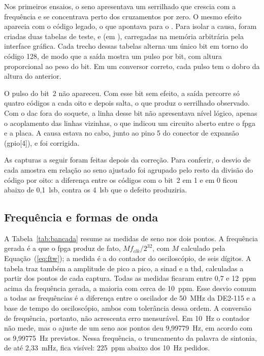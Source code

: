Nos primeiros ensaios, o seno apresentava um serrilhado que crescia com a frequência e se concentrava perto dos cruzamentos por zero. O mesmo efeito aparecia com o código legado, o que apontava para o . Para isolar a causa, foram criadas duas tabelas de teste,  e  (em ), carregadas na memória arbitrária pela interface gráfica. Cada trecho dessas tabelas alterna um único bit em torno do código 128, de modo que a saída mostra um pulso por bit, com altura proporcional ao peso do bit. Em um conversor correto, cada pulso tem o dobro da altura do anterior.

O pulso do bit~2 não apareceu. Com esse bit sem efeito, a saída percorre só quatro códigos a cada oito e depois salta, o que produz o serrilhado observado. Com o \acs{dac} fora do soquete, a linha desse bit não apresentava nível lógico, apenas o acoplamento das linhas vizinhas, o que indicou um circuito aberto entre o \ac{fpga} e a placa. A causa estava no cabo, junto ao pino 5 do conector de expansão (\acs{gpio}[4]), e foi corrigida.

As capturas a seguir foram feitas depois da correção. Para conferir, o desvio de cada amostra em relação ao seno ajustado foi agrupado pelo resto da divisão do código por oito: a diferença entre os códigos com o bit~2 em 1 e em 0 ficou abaixo de 0,1~\acs{lsb}, contra os 4~\acs{lsb} que o defeito produziria.

\subsection{Frequência e formas de onda}

A Tabela~\ref{tab:bancada} resume as medidas de seno nos dois pontos. A frequência gerada é a que o \ac{fpga} produz de fato, \(M f_{clk}/2^{32}\), com \(M\) calculado pela Equação~(\ref{eq:ftw}); a medida é a do contador do osciloscópio, de seis dígitos. A tabela traz também a amplitude de pico a pico, a \ac{sinad} e a \ac{thd}, calculadas a partir dos pontos de cada captura. Todas as medidas ficaram entre 0,7 e 12~ppm acima da frequência gerada, a maioria com cerca de 10~ppm. Esse desvio comum a todas as frequências é a diferença entre o oscilador de 50~MHz da DE2-115 e a base de tempo do osciloscópio, ambos com tolerância dessa ordem. A conversão de frequência, portanto, não acrescenta erro mensurável. Em 10~Hz o contador não mede, mas o ajuste de um seno aos pontos deu 9,99779~Hz, em acordo com os 9,99775~Hz previstos. Nessa frequência, o truncamento da palavra de sintonia, de até 2,33~mHz, fica visível: 225~ppm abaixo dos 10~Hz pedidos.

